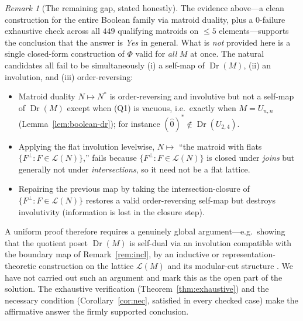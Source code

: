 \documentclass[11pt]{article}
\newcommand{\Dr}{\operatorname{Dr}}
\newcommand{\cL}{\mathcal{L}}
\newcommand{\dual}[1]{#1^{\ast}}
\theoremstyle{definition}
\theoremstyle{remark}
\newtheorem{remark}{Remark}
\begin{document}
\begin{remark}[The remaining gap, stated honestly]\label{rem:gap}
The evidence above---a clean construction for the entire Boolean family via matroid
duality, plus a $0$-failure exhaustive check across all $449$ qualifying matroids on
$\le 5$ elements---supports the conclusion that the answer is \emph{Yes} in general.
What is \emph{not} provided here is a single closed-form construction of $\Phi$
valid for \emph{all} $M$ at once. The natural candidates all fail to be simultaneously
(i) a self-map of $\Dr(M)$, (ii) an involution, and (iii) order-reversing:
\begin{itemize}
\item Matroid duality $N\mapsto\dual N$ is order-reversing and involutive but not a
self-map of $\Dr(M)$ except when (Q1) is vacuous, i.e.\ exactly when $M=U_{n,n}$
(Lemma~\ref{lem:boolean-dr}); for instance $\dual{(\hat 0)}\notin\Dr(U_{2,4})$.
\item Applying the flat involution levelwise, $N\mapsto$ ``the matroid with flats
$\{F^{\perp}:F\in\cL(N)\}$,'' fails because $\{F^{\perp}:F\in\cL(N)\}$ is closed
under \emph{joins} but generally not under \emph{intersections}, so it need not be a
flat lattice.
\item Repairing the previous map by taking the intersection-closure of
$\{F^{\perp}:F\in\cL(N)\}$ restores a valid order-reversing self-map but destroys
involutivity (information is lost in the closure step).
\end{itemize}
A uniform proof therefore requires a genuinely global argument---e.g.\ showing that
the quotient poset $\Dr(M)$ is self-dual via an involution compatible with the
boundary map of Remark~\ref{rem:incl}, by an inductive or representation-theoretic
construction on the lattice $\cL(M)$ and its modular-cut structure
\cite[Ch.~7]{White}. We have not carried out such an argument and mark this as the
open part of the solution. The exhaustive verification (Theorem~\ref{thm:exhaustive})
and the necessary condition (Corollary~\ref{cor:nec}, satisfied in every checked
case) make the affirmative answer the firmly supported conclusion.
\end{remark}
\end{document}

